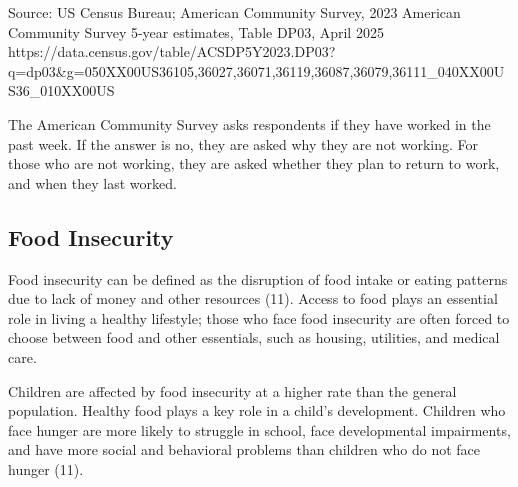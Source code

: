 \documentclass[
  english,
  letterpaper,
]{report}
\begin{document}
\begin{tcolorbox}[enhanced jigsaw, breakable, leftrule=.75mm, title=\textcolor{quarto-callout-note-color}{\faInfo}\hspace{0.5em}{Source}, bottomrule=.15mm, opacityback=0, left=2mm, colback=white, bottomtitle=1mm, coltitle=black, colbacktitle=quarto-callout-note-color!10!white, colframe=quarto-callout-note-color-frame, opacitybacktitle=0.6, toptitle=1mm, titlerule=0mm, arc=.35mm, rightrule=.15mm, toprule=.15mm]

Source: US Census Bureau; American Community Survey, 2023 American
Community Survey 5-year estimates, Table DP03, April 2025
https://data.census.gov/table/ACSDP5Y2023.DP03?q=dp03\&g=050XX00US36105,36027,36071,36119,36087,36079,36111\_040XX00US36\_010XX00US

\end{tcolorbox}

\begin{tcolorbox}[enhanced jigsaw, breakable, leftrule=.75mm, title=\textcolor{quarto-callout-note-color}{\faInfo}\hspace{0.5em}{Note}, bottomrule=.15mm, opacityback=0, left=2mm, colback=white, bottomtitle=1mm, coltitle=black, colbacktitle=quarto-callout-note-color!10!white, colframe=quarto-callout-note-color-frame, opacitybacktitle=0.6, toptitle=1mm, titlerule=0mm, arc=.35mm, rightrule=.15mm, toprule=.15mm]

The American Community Survey asks respondents if they have worked in
the past week. If the answer is no, they are asked why they are not
working. For those who are not working, they are asked whether they plan
to return to work, and when they last worked.

\end{tcolorbox}

\subsection{Food Insecurity}\label{food-insecurity}

Food insecurity can be defined as the disruption of food intake or
eating patterns due to lack of money and other resources (11). Access to
food plays an essential role in living a healthy lifestyle; those who
face food insecurity are often forced to choose between food and other
essentials, such as housing, utilities, and medical care.

Children are affected by food insecurity at a higher rate than the
general population. Healthy food plays a key role in a child's
development. Children who face hunger are more likely to struggle in
school, face developmental impairments, and have more social and
behavioral problems than children who do not face hunger (11).
\end{document}
